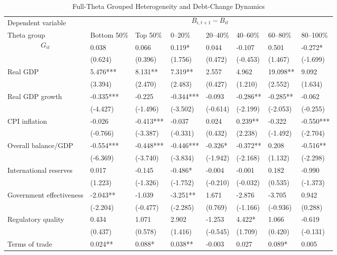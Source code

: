 \begin{table}[H]\centering
\begin{threeparttable}
\caption{Full-Theta Grouped Heterogeneity and Debt-Change Dynamics}
\label{tab:theta_group_heterogeneity_debt}
\scriptsize
\begin{tabularx}{\textwidth}{lYYYYYYY}
\toprule
Dependent variable &  \\
\cmidrule(lr){2-8}
Theta group & Bottom 50\% & Top 50\% & 0--20\% & 20--40\% & 40--60\% & 60--80\% & 80--100\% \\
\midrule
$$G_{it}$$ & 0.038 & 0.066 & 0.119* & 0.044 & -0.107 & 0.501 & -0.272* \\
  & (0.624) & (0.396) & (1.756) & (0.472) & (-0.453) & (1.467) & (-1.699) \\
Real GDP & 5.476*** & 8.131** & 7.319** & 2.557 & 4.962 & 19.098** & 9.092 \\
  & (3.394) & (2.470) & (2.483) & (0.427) & (1.210) & (2.552) & (1.634) \\
Real GDP growth & -0.335*** & -0.225 & -0.344*** & -0.093 & -0.286** & -0.285** & -0.062 \\
  & (-4.427) & (-1.496) & (-3.502) & (-0.614) & (-2.199) & (-2.053) & (-0.255) \\
CPI inflation & -0.026 & -0.413*** & -0.037 & 0.024 & 0.239** & -0.322 & -0.550*** \\
  & (-0.766) & (-3.387) & (-0.331) & (0.432) & (2.238) & (-1.492) & (-2.704) \\
Overall balance/GDP & -0.554*** & -0.448*** & -0.446*** & -0.326* & -0.372** & 0.208 & -0.516** \\
  & (-6.369) & (-3.740) & (-3.834) & (-1.942) & (-2.168) & (1.132) & (-2.298) \\
International reserves & 0.017 & -0.145 & -0.486* & -0.004 & -0.001 & 0.182 & -0.990 \\
  & (1.223) & (-1.326) & (-1.752) & (-0.210) & (-0.032) & (0.535) & (-1.373) \\
Government effectiveness & -2.043** & -1.039 & -3.251** & 1.671 & -2.876 & -3.705 & 0.942 \\
  & (-2.204) & (-0.477) & (-2.285) & (0.769) & (-1.166) & (-0.936) & (0.288) \\
Regulatory quality & 0.434 & 1.071 & 2.902 & -1.253 & 4.422* & 1.066 & -0.619 \\
  & (0.437) & (0.578) & (1.416) & (-0.545) & (1.709) & (0.420) & (-0.131) \\
Terms of trade & 0.024** & 0.088* & 0.038** & -0.003 & 0.027 & 0.089* & 0.005 \\

\end{tabularx}
\end{threeparttable}
\end{table}
